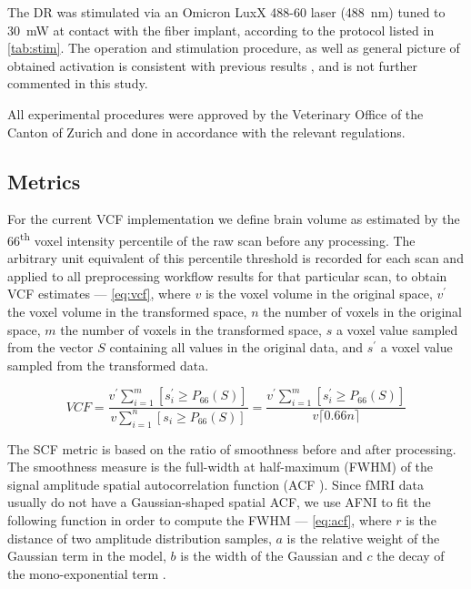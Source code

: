 The DR was stimulated via an Omicron LuxX 488-60 laser (\SI{488}{\nano\meter}) tuned to \SI{30}{\milli\watt} at contact with the fiber implant, according to the protocol listed in \cref{tab:stim}.
The operation and stimulation procedure, as well as general picture of obtained activation is consistent with previous results \cite{Grandjean2019}, and is not further commented in this study.

All experimental procedures were approved by the Veterinary Office of the Canton of Zurich and done in accordance with the relevant regulations.

\subsection{Metrics}

For the current VCF implementation we define brain volume as estimated by the 66\textsuperscript{th} voxel intensity percentile of the raw scan before any processing.
The arbitrary unit equivalent of this percentile threshold is recorded for each scan and applied to all preprocessing workflow results for that particular scan, to obtain VCF estimates
 --- \cref{eq:vcf}, where $v$ is the voxel volume in the original space, $v^\prime$ the voxel volume in the transformed space, $n$ the number of voxels in the original space, $m$ the number of voxels in the transformed space, $s$ a voxel value sampled from the vector $S$ containing all values in the original data, and $s^\prime$ a voxel value sampled from the transformed data.

\begin{equation} \label{eq:vcf}
        V\!C\!F
        = \frac{v^\prime\sum_{i=1}^m [s^\prime_i \geq P_{66}(S)]}{v\sum_{i=1}^n [s_i \geq P_{66}(S)]}
        = \frac{v^\prime\sum_{i=1}^m [s^\prime_i \geq P_{66}(S)]}{v \lceil0.66n\rceil}
\end{equation}

The SCF metric is based on the ratio of smoothness before and after processing.
The smoothness measure is the full-width at half-maximum (FWHM) of the signal amplitude spatial autocorrelation function (ACF \cite{eklund2016cluster}).
Since fMRI data usually do not have a Gaussian-shaped spatial ACF, we use AFNI \cite{cox1996afni} to fit the following function in order to compute the FWHM ---
\cref{eq:acf}, where $r$ is the distance of two amplitude distribution samples, $a$ is the relative weight of the Gaussian term in the model, $b$ is the width of the Gaussian and $c$ the decay of the mono-exponential term \cite{cox2017fmri}.

